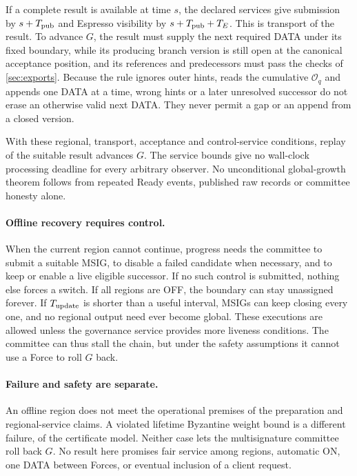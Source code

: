\documentclass[11pt,a4paper]{article}
\begin{document}
If a complete result is available at time $s$, the declared services give
submission by $s+T_{\rm pub}$ and Espresso visibility by
$s+T_{\rm pub}+T_E$. This is transport of the result. To advance $G$, the
result must supply the next required DATA under its fixed boundary, while
its producing branch version is still open at the canonical acceptance
position, and its references and predecessors must pass the checks of
\cref{sec:exports}. Because the rule ignores outer hints, reads the
cumulative $\mathcal O_q$ and appends one DATA at a time, wrong hints or
a later unresolved successor do not erase an otherwise valid next DATA. They never permit a gap or an append from a
closed version.

With these regional, transport, acceptance and control-service
conditions, replay of the suitable result advances $G$. The service
bounds give no wall-clock processing deadline for every arbitrary
observer. No unconditional global-growth theorem follows from repeated
Ready events, published raw records or committee honesty alone.

\paragraph{Offline recovery requires control.}
When the current region cannot continue, progress needs the committee to
submit a suitable MSIG, to disable a failed candidate when necessary, and
to keep or enable a live eligible successor. If no such control is
submitted, nothing else forces a switch. If all regions are OFF, the
boundary can stay unassigned forever. If $T_{\rm update}$ is shorter than
a useful interval, MSIGs can keep closing every one, and no regional
output need ever become global. These executions
are allowed unless the governance service provides more liveness
conditions. The committee can thus stall the chain, but under the
safety assumptions it cannot use a Force to roll $G$ back.

\paragraph{Failure and safety are separate.}
An offline region does not meet the operational premises of the
preparation and regional-service claims. A violated lifetime Byzantine
weight bound is a different failure, of the certificate model. Neither
case lets the multisignature committee roll back $G$. No result here
promises fair service among regions, automatic ON, one DATA between
Forces, or eventual inclusion of a client request.
\end{document}
